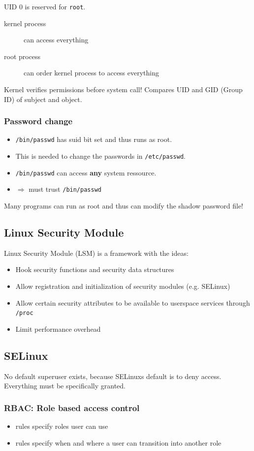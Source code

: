UID 0 is reserved for \texttt{root}.
\begin{description}
    \item[kernel process] can access everything
    \item[root process] can order kernel process to access everything
\end{description}

Kernel verifies permissions before system call! Compares UID and GID (Group ID) of subject and object.

\subsubsection{Password change}
\begin{itemize}
  \item \texttt{/bin/passwd} has suid bit set and thus runs as root.
  \item This is needed to change the passwords in \texttt{/etc/passwd}.
  \item \texttt{/bin/passwd} can access \textbf{any} system ressource.
  \item $\Rightarrow$ must trust \texttt{/bin/passwd}
\end{itemize}
Many programs can run as root and thus can modify the
shadow password file!


\subsection{Linux Security Module}
Linux Security Module (LSM) is a framework with the ideas:
\begin{itemize}
  \item Hook security functions and security data structures
  \item Allow registration and initialization of security modules (e.g.
    SELinux)
  \item Allow certain security attributes to be available to userspace services
    through \texttt{/proc}
  \item Limit performance overhead
\end{itemize}


\subsection{SELinux}
No default superuser exists, because SELinuxs default is to deny access. Everything must be specifically granted.

\subsubsection{RBAC: Role based access control}
\begin{itemize}
  \item rules specify roles user can use
  \item rules specify when and where a user can transition into another role
\end{itemize}

